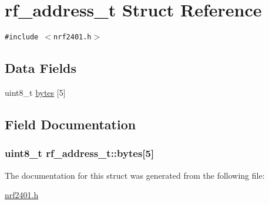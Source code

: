 \hypertarget{structrf__address__t}{
\section{rf\_\-address\_\-t Struct Reference}
\label{structrf__address__t}
}
{\tt \#include $<$nrf2401.h$>$}

\subsection*{Data Fields}
\begin{CompactItemize}
\item 
uint8\_\-t \hyperlink{structrf__address__t_23d0b0dc9aaacf018873043cd9f54d56}{bytes} \mbox{[}5\mbox{]}
\end{CompactItemize}


\subsection{Field Documentation}
\hypertarget{structrf__address__t_23d0b0dc9aaacf018873043cd9f54d56}{
\subsubsection{\setlength{\rightskip}{0pt plus 5cm}uint8\_\-t {\bf rf\_\-address\_\-t::bytes}\mbox{[}5\mbox{]}}}
\label{structrf__address__t_23d0b0dc9aaacf018873043cd9f54d56}




The documentation for this struct was generated from the following file:\begin{CompactItemize}
\item 
\hyperlink{nrf2401_8h}{nrf2401.h}\end{CompactItemize}
